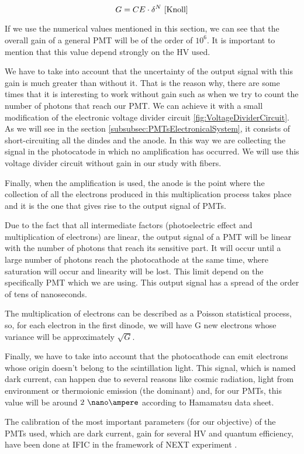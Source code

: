 \begin{itemize}
\begin{equation}
G = CE\cdot{} \delta^N~\cite{Knoll}
\label{eq:PMTGain}
\end{equation}

If we use the numerical values mentioned in this section, we can see that the overall gain of a general PMT will be of the order of $10^6$. It is important to mention that this value depend strongly on the HV used.

We have to take into account that the uncertainty of the output signal with this gain is much greater than without it. That is the reason why, there are some times that it is interesting to work without gain such as when we try to count the number of photons that reach our PMT. We can achieve it with a small modification of the electronic voltage divider circuit \ref{fig:VoltageDividerCircuit}. As we will see in the section \ref{subsubsec:PMTsElectronicalSystem}, it consists of short-circuiting all the dindes and the anode. In this way we are collecting the signal in the photocatode in which no amplification has occurred. We will use this voltage divider circuit without gain in our study with fibers.

Finally, when the amplification is used, the anode is the point where the collection of all the electrons produced in this multiplication process takes place and it is the one that gives rise to the output signal of PMTs. 

\end{itemize}

Due to the fact that all intermediate factors (photoelectric effect and multiplication of electrons) are linear, the output signal of a PMT will be linear with the number of photons that reach its sensitive part. It will occur until a large number of photons reach the photocathode at the same time, where saturation will occur and linearity will be lost. This limit depend on the specifically PMT which we are using. This output signal has a spread of the order of tens of nanoseconds.

The multiplication of electrons can be described as a Poisson statistical process, so, for each electron in the first dinode, we will have G new electrons whose variance will be approximately $\sqrt{G}$.

Finally, we have to take into account that the photocathode can emit electrons whose origin doesn't belong to the scintillation light. This signal, which is named dark current, can  happen due to several reasons like cosmic radiation, light from environment or thermoionic emission (the dominant) and, for our PMTs, this value will be around $2~\nano\ampere$ according to Hamamatsu data sheet.

The calibration of the most important parameters (for our objective) of the PMTs used, which are dark current, gain for several HV and quantum efficiency,  have been done at IFIC in the framework of NEXT experiment \cite{CalibrationPMTsNEXT}. 